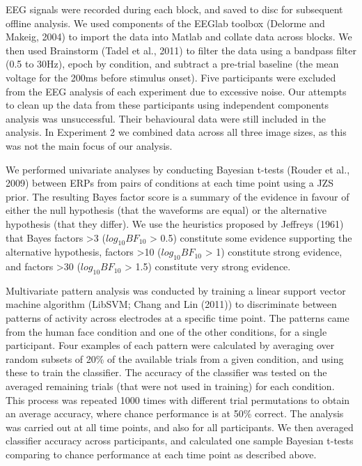\documentclass[
]{article}
\begin{document}
EEG signals were recorded during each block, and saved to disc for subsequent offline analysis. We used components of the EEGlab toolbox (Delorme and Makeig, 2004) to import the data into Matlab and collate data across blocks. We then used Brainstorm (Tadel et al., 2011) to filter the data using a bandpass filter (0.5 to 30Hz), epoch by condition, and subtract a pre-trial baseline (the mean voltage for the 200ms before stimulus onset). Five participants were excluded from the EEG analysis of each experiment due to excessive noise. Our attempts to clean up the data from these participants using independent components analysis was unsuccessful. Their behavioural data were still included in the analysis. In Experiment 2 we combined data across all three image sizes, as this was not the main focus of our analysis.

We performed univariate analyses by conducting Bayesian t-tests (Rouder et al., 2009) between ERPs from pairs of conditions at each time point using a JZS prior. The resulting Bayes factor score is a summary of the evidence in favour of either the null hypothesis (that the waveforms are equal) or the alternative hypothesis (that they differ). We use the heuristics proposed by Jeffreys (1961) that Bayes factors \textgreater3 (\(log_{10}BF_{10}\) \textgreater{} 0.5) constitute some evidence supporting the alternative hypothesis, factors \textgreater10 (\(log_{10}BF_{10}\) \textgreater{} 1) constitute strong evidence, and factors \textgreater30 (\(log_{10}BF_{10}\) \textgreater{} 1.5) constitute very strong evidence.

Multivariate pattern analysis was conducted by training a linear support vector machine algorithm (LibSVM; Chang and Lin (2011)) to discriminate between patterns of activity across electrodes at a specific time point. The patterns came from the human face condition and one of the other conditions, for a single participant. Four examples of each pattern were calculated by averaging over random subsets of 20\% of the available trials from a given condition, and using these to train the classifier. The accuracy of the classifier was tested on the averaged remaining trials (that were not used in training) for each condition. This process was repeated 1000 times with different trial permutations to obtain an average accuracy, where chance performance is at 50\% correct. The analysis was carried out at all time points, and also for all participants. We then averaged classifier accuracy across participants, and calculated one sample Bayesian t-tests comparing to chance performance at each time point as described above.
\end{document}
